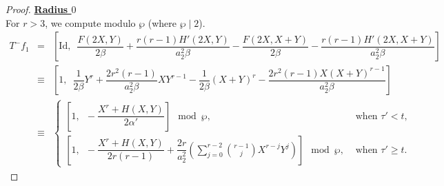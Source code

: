 \documentclass[11pt, reqno]{amsart}
\numberwithin{equation}{section}
\theoremstyle{definition}
\theoremstyle{remark}
\theoremstyle{definition}
\theoremstyle{remark}
\theoremstyle{remark}
\begin{document}
\begin{proof}
\noindent \textbf{ \underline{Radius $0$}}\\
  For $r>3$, we compute modulo $\wp$ (where $\wp\mid 2$).
  \begin{eqnarray*}
T^-f_1 &=&
\left[\mathrm{Id},\enspace\dfrac{F(2X,Y)}{2\beta}+\dfrac{r(r-1)H'(2X,Y)}{a_2^2\beta}- \dfrac{F(2X,X+Y)}{2\beta}-\dfrac{r(r-1)H'(2X,X+Y)}{a_{2}^2\beta}\right]\nonumber\\ 
  &\equiv& 
      \left[1,\enspace \dfrac{1}{2\beta}Y^r+\dfrac{2r^2(r-1)}{a_2^2\beta}XY^{r-1}-\dfrac{1}{2\beta}(X+Y)^r-\dfrac{2r^2(r-1)X(X+Y)^{r-1}}{a_2^2\beta}\right] \\
  &\equiv& 
  \begin{cases}
      \left[1,\enspace -\dfrac{X^r+H(X,Y)}{2\alpha'}\right]\mod \wp, &\text{ when } \tau'<t,\\
      \left[1,\enspace  -\dfrac{X^r+H(X,Y)}{2r(r-1)}+ \dfrac{2r}{a_{2}^2}\left( \displaystyle\sum_{j=0}^{r-2}{r-1 \choose j}X^{r-j}Y^{j}\right)\right]\mod \wp, &\text{ when } \tau'\geq t .     
      \end{cases}
 \end{eqnarray*}
  

\end{proof}
\end{document}
